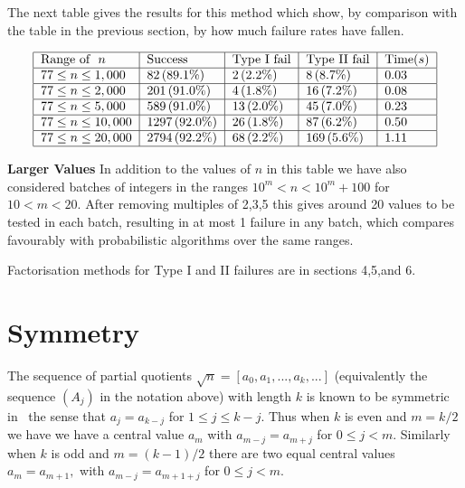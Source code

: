 \documentclass[12pt]{article}
\begin{document}
The next table gives the results for this method which show, by comparison
with the table in the previous section, by how much failure rates have
fallen.

\begin{equation*}
\begin{tabular}{|l|l|l|l|l|}
\hline
Range of $\ n$ & Success & Type I fail & Type II fail & Time$(s)$ \\ \hline
$77\leq n\leq 1,000$ & $82\left( 89.1\%\right) $ & $2\left( 2.2\%\right) $ & 
$8\left( 8.7\%\right) $ & $0.03$ \\ \hline
$77\leq n\leq 2,000$ & $201\left( 91.0\%\right) $ & $4\left( 1.8\%\right) $
& $16\left( 7.2\%\right) $ & $0.08$ \\ \hline
$77\leq n\leq 5,000$ & $589\left( 91.0\%\right) $ & $13\left( 2.0\%\right) $
& $45\left( 7.0\%\right) $ & $0.23$ \\ \hline
$77\leq n\leq 10,000$ & $1297\left( 92.0\%\right) $ & $26\left( 1.8\%\right) 
$ & $87\left( 6.2\%\right) $ & $0.50$ \\ \hline
$77\leq n\leq 20,000$ & $2794\left( 92.2\%\right) $ & $68\left( 2.2\%\right) 
$ & $169\left( 5.6\%\right) $ & $1.11$ \\ \hline
\end{tabular}%
\end{equation*}

\bigskip

\textbf{Larger Values} In addition to the values of $n$ in this table we
have also considered batches of integers in the ranges $10^{m}<n<10^{m}+100$
for $10<m<20$. After removing multiples of 2,3,5 this gives around 20 values
to be tested in each batch, resulting in at most 1 failure in any batch,
which compares favourably with probabilistic algorithms over the same ranges.

Factorisation methods for Type I and II failures are in sections 4,5,and 6.

\section{Symmetry\label{sy}}

The sequence of partial quotients $\sqrt{n}=\left[ a_{0},a_{1},...,a_{k},...%
\right] $ (equivalently the sequence $\left( A_{j}\right) $ in the notation
above) with length $k$ is known to be symmetric in \ the sense that $%
a_{j}=a_{k-j}$ for $1\leq j\leq k-j.$ Thus when $k$ is even and $m=k/2$ we
have we have a central value $a_{m}$ with $a_{m-j}=a_{m+j}$ for $0\leq j<m.$
Similarly when $k$ is odd and $m=\left( k-1\right) /2$ there are two equal
central values $a_{m}=a_{m+1},$ with $a_{m-j}=a_{m+1+j}$ for $0\leq j<m.$
\end{document}
